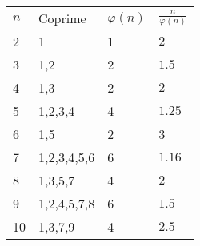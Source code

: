 \documentclass{article}
\begin{document}
	\begin{table}[]
		\begin{tabular}{llll}
		$n$ & Coprime     & $\varphi(n)$ & $\frac{n}{\varphi(n)}$ \\
		2   & 1           & 1            & $2$                    \\
		3   & 1,2         & 2            & $1.5$                  \\
		4   & 1,3         & 2            & $2$                    \\
		5   & 1,2,3,4     & 4            & $1.25$                 \\
		6   & 1,5         & 2            & 3                      \\
		7   & 1,2,3,4,5,6 & 6            & $1.16$                 \\
		8   & 1,3,5,7     & 4            & $2$                    \\
		9   & 1,2,4,5,7,8 & 6            & $1.5$                  \\
		10  & 1,3,7,9     & 4            & $2.5$                 
		\end{tabular}
	\end{table}
\end{document}
